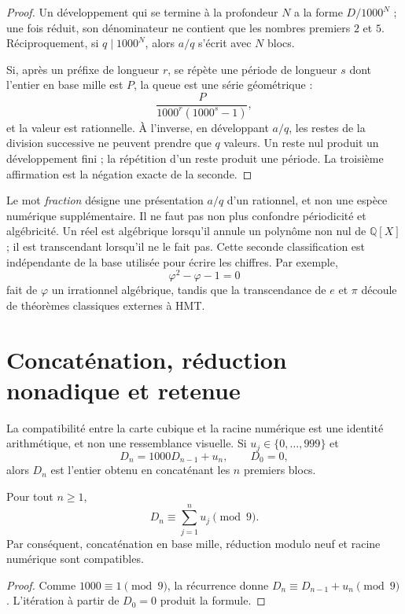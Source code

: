 \begin{proof}
Un développement qui se termine à la profondeur \(N\) a la forme
\(D/1000^N\) ; une fois réduit, son dénominateur ne contient que les nombres premiers \(2\) et
\(5\). Réciproquement, si \(q\mid1000^N\), alors \(a/q\) s'écrit avec
\(N\) blocs.

Si, après un préfixe de longueur \(r\), se répète une période de longueur
\(s\) dont l'entier en base mille est \(P\), la queue est une série géométrique :
\[
 \frac{P}{1000^r(1000^s-1)},
\]
et la valeur est rationnelle. À l'inverse, en développant \(a/q\), les restes de la
division successive ne peuvent prendre que \(q\) valeurs. Un reste nul produit un
développement fini ; la répétition d'un reste produit une période. La troisième
affirmation est la négation exacte de la seconde.
\end{proof}

Le mot \emph{fraction} désigne une présentation \(a/q\) d'un rationnel,
et non une espèce numérique supplémentaire. Il ne faut pas non plus confondre périodicité et
algébricité. Un réel est algébrique lorsqu'il annule un polynôme non nul de
\(\mathbb Q[X]\) ; il est transcendant lorsqu'il ne le fait pas. Cette seconde
classification est indépendante de la base utilisée pour écrire les chiffres.
Par exemple,
\[
 \varphi^2-\varphi-1=0
\]
fait de \(\varphi\) un irrationnel algébrique, tandis que la transcendance
de \(e\) et \(\pi\) découle de théorèmes classiques externes à HMT\@.

\section{Concaténation, réduction nonadique et retenue}

La compatibilité entre la carte cubique et la racine numérique est une identité
arithmétique, et non une ressemblance visuelle. Si \(u_j\in\{0,\ldots,999\}\) et
\[
 D_n=1000D_{n-1}+u_n,
 \qquad D_0=0,
\]
alors \(D_n\) est l'entier obtenu en concaténant les \(n\) premiers
blocs.

\begin{theorem}
\label{thm:checksum-nonadico-base-mil}
Pour tout \(n\geq1\),
\[
 D_n\equiv\sum_{j=1}^n u_j\pmod9.
\]
Par conséquent, concaténation en base mille, réduction modulo neuf et racine numérique
sont compatibles.
\end{theorem}

\begin{proof}
Comme \(1000\equiv1\pmod9\), la récurrence donne
\(D_n\equiv D_{n-1}+u_n\pmod9\). L'itération à partir de \(D_0=0\) produit la
formule.
\end{proof}

